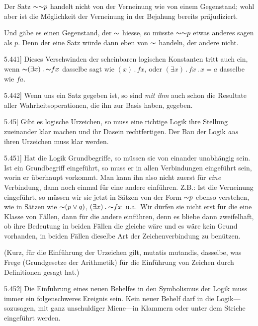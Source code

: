 \documentclass[12pt,oneside]{book}[2007/10/19]
\newcommand{\PropERef}[1]{\hyperref[PropE:#1]{#1}}
\newcommand{\PropositionG}[2]{%
  \item[\phantomsection\label{PropG:#1}\PropERef{#1}] #2%
}
\newcommand{\Not}[1]{\mathord{\thicksim} #1}
\newcommand{\DotOp}{\mathbin{.}}
\newcommand{\Emph}[1]{\emph{#1}}%
\newcommand{\ZumBeispiel}{Z.\;B.}
\newcommand{\undAndere}{u.\;a.}
\begin{document}
\begin{propositions}
{Der Satz \glqq{}$\Not{\Not{p}}$\grqq{} handelt nicht von der Verneinung
wie von einem Gegenstand; wohl aber ist
die Möglichkeit der Verneinung in der Bejahung
bereits präjudiziert.

Und gäbe es einen Gegenstand, der \glqq{}$\Not{}$\grqq{} hiesse,
so müsste \glqq{}$\Not{\Not{p}}$\grqq{} etwas anderes sagen als \glqq{}$p$\grqq{}.
Denn der eine Satz würde dann eben von $\Not{}$
handeln, der andere nicht.}


\PropositionG{5.441}
{Dieses Verschwinden der scheinbaren logischen
Konstanten tritt auch ein, wenn \glqq{}$\Not{(\exists x) \DotOp \Not{fx}}$\grqq{}
dasselbe sagt wie \glqq{}$(x) \DotOp fx$\grqq{}, oder \glqq{}$(\exists x) \DotOp fx \DotOp x = a$\grqq{}
dasselbe wie \glqq{}$fa$\grqq{}.}


\PropositionG{5.442}
{Wenn uns ein Satz gegeben ist, so sind \Emph{mit
ihm} auch schon die Resultate aller Wahrheitsoperationen,
die ihn zur Basis haben, gegeben.}


\PropositionG{5.45}
{Gibt es logische Urzeichen, so muss eine richtige
Logik ihre Stellung zueinander klar machen und
ihr Dasein rechtfertigen. Der Bau der Logik \Emph{aus}
ihren Urzeichen muss klar werden.}


\PropositionG{5.451}
{Hat die Logik Grundbegriffe, so müssen sie von
einander unabhängig sein. Ist ein Grundbegriff
eingeführt, so muss er in allen Verbindungen
eingeführt sein, worin er überhaupt vorkommt. Man
kann ihn also nicht zuerst für \Emph{eine} Verbindung,
dann noch einmal für eine andere einführen.
\ZumBeispiel: Ist die Verneinung eingeführt, so müssen
wir sie jetzt in Sätzen von der Form \glqq{}$\Not{p}$\grqq{} ebenso
verstehen, wie in Sätzen wie \glqq{}$\Not{(p \lor q)}$\grqq{}, \glqq{}$(\exists x) \DotOp \Not{fx}$\grqq{}~\undAndere\ 
Wir dürfen sie nicht erst für die eine Klasse
von Fällen, dann für die andere einführen, denn es
bliebe dann zweifelhaft, ob ihre Bedeutung in beiden
Fällen die gleiche wäre und es wäre kein Grund
vorhanden, in beiden Fällen dieselbe Art der
Zeichenverbindung zu benützen.

(Kurz, für die Einführung der Urzeichen gilt,
mutatis mutandis, dasselbe, was Frege (\glqq{}Grundgesetze
der Arithmetik\grqq{}) für die Einführung von
Zeichen durch Definitionen gesagt hat.)}


\PropositionG{5.452}
{Die Einführung eines neuen Behelfes in den Symbolismus
der Logik muss immer ein folgenschweres
Ereignis sein. Kein neuer Behelf darf in die Logik---sozusagen,
mit ganz unschuldiger Miene---in Klammern
oder unter dem Striche eingeführt werden.

}
\end{propositions}
\end{document}
